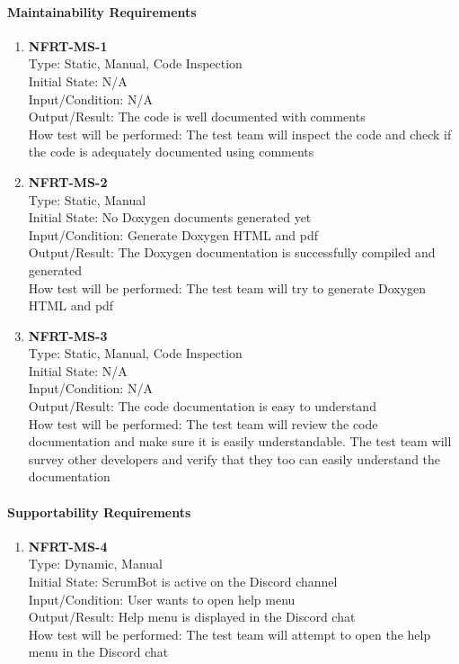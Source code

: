 \documentclass[12pt, titlepage]{article}
\begin{document}
\paragraph{Maintainability Requirements}
\begin{enumerate}

\item{\textbf{NFRT-MS-1}}\\
Type: Static, Manual, Code Inspection\\
Initial State: N/A\\
Input/Condition: N/A\\
Output/Result: The code is well documented with comments\\
How test will be performed: The test team will inspect the code and check if the code is adequately documented using comments

\item{\textbf{NFRT-MS-2}}\\
Type: Static, Manual\\
Initial State: No Doxygen documents generated yet\\
Input/Condition: Generate Doxygen HTML and pdf\\
Output/Result: The Doxygen documentation is successfully compiled and generated\\
How test will be performed: The test team will try to generate Doxygen HTML and pdf

\item{\textbf{NFRT-MS-3}}\\
Type: Static, Manual, Code Inspection\\
Initial State: N/A\\
Input/Condition: N/A\\
Output/Result: The code documentation is easy to understand\\
How test will be performed: The test team will review the code documentation and make sure it is easily understandable. The test team will survey other developers and verify that they too can easily understand the documentation
\end{enumerate}

\paragraph{Supportability Requirements}
\begin{enumerate}
\item{\textbf{NFRT-MS-4}}\\
Type: Dynamic, Manual\\
Initial State: ScrumBot is active on the Discord channel\\
Input/Condition: User wants to open help menu\\
Output/Result: Help menu is displayed in the Discord chat\\
How test will be performed: The test team will attempt to open the help menu in the Discord chat

\end{enumerate}
\end{document}
